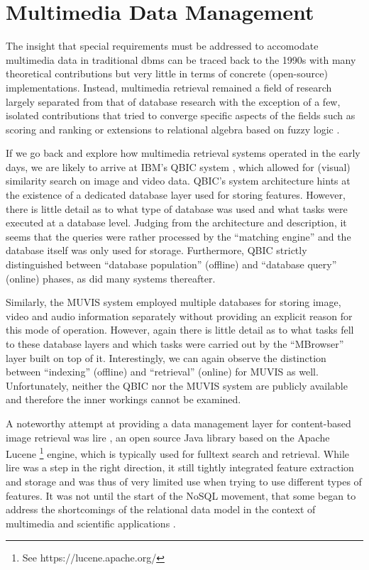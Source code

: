\chapter{Multimedia Data Management}
\label{chapter:theory_multimedia_database}

The insight that special requirements must be addressed to accomodate multimedia data in traditional \acrshort{dbms} can be traced back to the 1990s \cite{Marcus:1996Foundations,Adjeroh:1997Multimedia} with many theoretical contributions but very little in terms of concrete (open-source) implementations. Instead, multimedia retrieval remained a field of research largely separated from that of database research with the exception of a few, isolated contributions that tried to converge specific aspects of the fields such as scoring and ranking \cite{Chengkai:2005RankSQL,Zhang:2006Boolean} or extensions to relational algebra based on fuzzy logic \cite{Montesi:1999Similarity}.

If we go back and explore how multimedia retrieval systems operated in the early days, we are likely to arrive at IBM's QBIC system \cite{Flickner:1995Query}, which allowed for (visual) similarity search on image and video data. QBIC's system architecture hints at the existence of a dedicated database layer used for storing features. However, there is little detail as to what type of database was used and what tasks were executed at a database level. Judging from the architecture and description, it seems that the queries were rather processed by the ``matching engine'' and the database itself was only used for storage. Furthermore, QBIC strictly distinguished between ``database population'' (offline) and ``database query'' (online) phases, as did many systems thereafter.

Similarly, the MUVIS \cite{Kiranyaz:2003Muvis} system employed multiple databases for storing image, video and audio information separately without providing an explicit reason for this mode of operation. However, again there is little detail as to what tasks fell to these database layers and which tasks were carried out by the ``MBrowser'' layer built on top of it. Interestingly, we can again observe the distinction between ``indexing'' (offline) and ``retrieval'' (online) for MUVIS as well. Unfortunately, neither the QBIC nor the MUVIS system are publicly available and therefore the inner workings cannot be examined.

A noteworthy attempt at providing a data management layer for content-based image retrieval was \acrfull{lire} \cite{Luc:2008LIRE}, an open source Java library based on the Apache Lucene \footnote{See https://lucene.apache.org/} engine, which is typically used for fulltext search and retrieval. While \acrshort{lire} was a step in the right direction, it still tightly integrated feature extraction and storage and was thus of very limited use when trying to use different types of features. It was not until the start of the NoSQL movement, that some began to address the shortcomings of the relational data model in the context of multimedia and scientific applications \cite{Silva:2010SimDB,Stonebraker:2013SciDB}.

